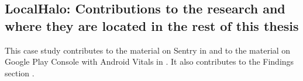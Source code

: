 \subsection{LocalHalo: Contributions to the research and where they are located in the rest of this thesis}
This case study contributes to the material on Sentry in  and to the material on Google Play Console with Android Vitals in . It also contributes to the Findings section .

